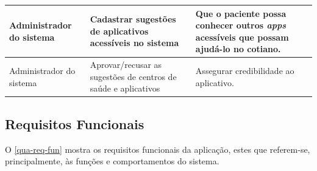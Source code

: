 \begin{quadro}[htb]
\begin{center}
\begin{tabular}{|p{2.0cm}|p{5.0cm}|p{7.0cm}|}
            \hline
            Administrador do sistema                                       &
            Cadastrar sugestões de aplicativos acessíveis no sistema       &
            Que o paciente possa conhecer outros \emph{apps} acessíveis que possam ajudá\@-lo no cotiano.                       \\
            \hline
            Administrador do sistema                                       &
            Aprovar/recusar as sugestões de centros de saúde e aplicativos &
            Assegurar credibilidade ao aplicativo.                                                                              \\
            \hline
        \end{tabular}
    \end{center}
\end{quadro}

\newpage

\subsection{Requisitos Funcionais}

O \autoref{qua-req-fun} mostra os requisitos funcionais da aplicação, estes que referem-se, principalmente, às funções e
comportamentos do sistema.

